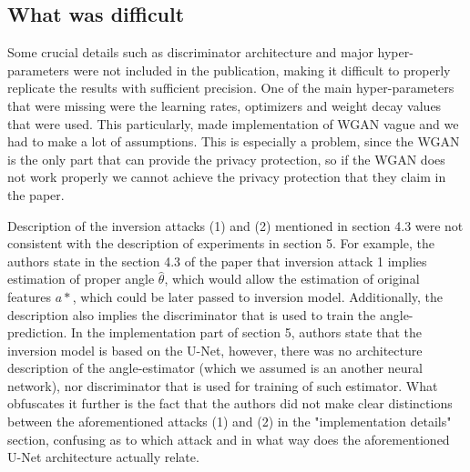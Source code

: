 \subsection{What was difficult}

Some crucial details such as discriminator architecture and major hyper-parameters were not included in the publication, making it difficult to properly replicate the results with sufficient precision. One of the main hyper-parameters that were missing were the learning rates, optimizers and weight decay values that were used. This particularly, made implementation of WGAN vague and we had to make a lot of assumptions. This is especially a problem, since the WGAN is the only part that can provide the privacy protection, so if the WGAN does not work properly we cannot achieve the privacy protection that they claim in the paper.

Description of the inversion attacks (1) and (2) mentioned in section 4.3 were not consistent with the description of experiments in section 5. For example, the authors state in the section 4.3 of the paper that inversion attack 1 implies  estimation of proper angle $\hat{\theta}$, which would allow the estimation of original features $a*$, which could be later passed to inversion model. Additionally, the description also implies the discriminator that is used to train the angle-prediction. In the implementation part of section 5, authors state that the inversion model is based on the U-Net, however, there was no architecture description of the angle-estimator (which we assumed is an another neural network), nor discriminator that is used for training of such estimator. What obfuscates it further is the fact that the authors did not make clear distinctions between the aforementioned attacks (1) and (2) in the "implementation details" section, confusing as to which attack and in what way does the aforementioned U-Net architecture actually relate.




\newpage

